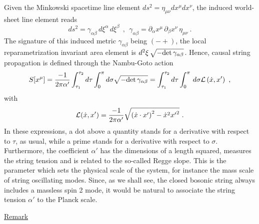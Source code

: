 \documentclass[a4paper,11pt]{article}
\begin{document}
Given the Minkowski spacetime line element $ds^2=\eta_{\mu\nu}dx^\mu dx^\nu$,
the induced world-sheet line element reads
\begin{equation}
ds^2=\gamma_{\alpha\beta}\,d\xi^\alpha\,d\xi^\beta\ \ ,\ \ 
\gamma_{\alpha\beta}=\partial_\alpha x^\mu\,\partial_\beta x^\nu\,
\eta_{\mu\nu}\ .
\end{equation}
The signature of this induced metric $\gamma_{\alpha\beta}$ being $(-+)$,
the local reparametrization invariant area element is 
$d^2\xi\,\sqrt{-{\rm det}\,\gamma_{\alpha\beta}}$. Hence, causal
string propagation is defined through the Nambu-Goto action
\begin{equation}
S[x^\mu]=\frac{-1}{2\pi\alpha'}\int_{\tau_1}^{\tau_2}d\tau\int_0^\pi
d\sigma\sqrt{-{\rm det}\,\gamma_{\alpha\beta}}=
\int_{\tau_1}^{\tau_2}d\tau\int_0^\pi\,d\sigma{\cal L}
\left(\dot{x},x'\right)\ ,
\end{equation}
with
\begin{equation}
{\cal L}(\dot{x},x')=\frac{-1}{2\pi\alpha'}
\sqrt{\left(\dot{x}\cdot x'\right)^2-\dot{x}^2{x'}^2}\ .
\end{equation}
In these expressions, a dot above a quantity stands for a derivative
with respect to $\tau$, as usual, while a prime stands for a derivative
with respect to $\sigma$. Furthermore, the coefficient $\alpha'$ has
the dimensions of a length squared, measures the string tension and
is related to the so-called Regge slope. This is the parameter which sets
the physical scale of the system, for instance the mass scale of string
oscillating modes. Since, as we shall see, the closed bosonic string
always includes a massless spin 2 mode, it would be natural to associate
the string tension $\alpha'$ to the Planck scale.

\vspace{10pt}

\noindent\underline{Remark}

\vspace{5pt}
\end{document}
